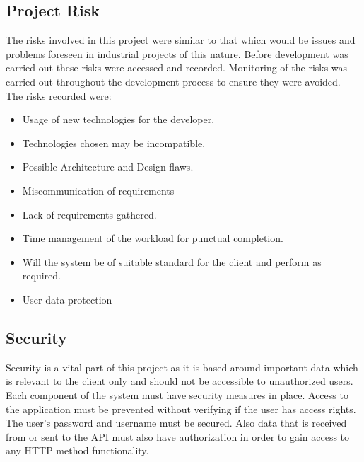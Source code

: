 \subsection{Project Risk}
The risks involved in this project were similar to that which would be issues and problems foreseen in industrial projects of this nature. Before development was carried out these risks were accessed and recorded. Monitoring of the risks was carried out throughout the development process to ensure they were avoided.\\
The risks recorded were: 
\begin{itemize}
    \item Usage of new technologies for the developer.
    \item Technologies chosen may be incompatible.
    \item Possible Architecture and Design flaws.
    \item Miscommunication of requirements
    \item Lack of requirements gathered.
    \item Time management of the workload for punctual completion.
    \item Will the system be of suitable standard for the client and perform as required.
    \item User data protection
\end{itemize}

\subsection{Security}
Security is a vital part of this project as it is based around important data which is relevant to the client only and should not be accessible to unauthorized users. Each component of the system must have security measures in place. Access to the application must be prevented without verifying if the user has access rights. The user’s password and username must be secured. Also data that is received from or sent to the API must also have authorization in order to gain access to any HTTP method functionality.
\newpage

